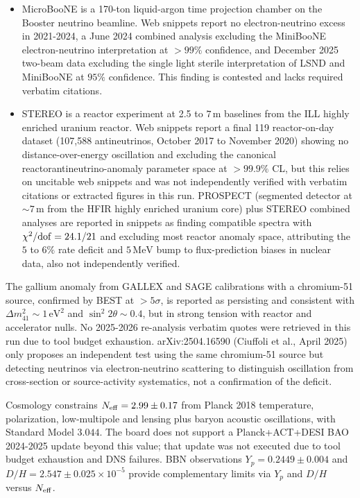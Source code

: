 \documentclass[11pt,a4paper]{article}
\begin{document}
\begin{itemize}
  \item MicroBooNE is a 170-ton liquid-argon time projection chamber on the Booster neutrino beamline. Web snippets report no electron-neutrino excess in 2021-2024, a June 2024 combined analysis excluding the MiniBooNE electron-neutrino interpretation at $>99\%$ confidence, and December 2025 two-beam data excluding the single light sterile interpretation of LSND and MiniBooNE at $95\%$ confidence. This finding is contested and lacks required verbatim citations.
  \item STEREO is a reactor experiment at 2.5 to $7\,\mathrm{m}$ baselines from the ILL highly enriched uranium reactor. Web snippets report a final 119 reactor-on-day dataset (107,588 antineutrinos, October 2017 to November 2020) showing no distance-over-energy oscillation and excluding the canonical reactorantineutrino-anomaly parameter space at $>99.9\%$ CL, but this relies on uncitable web snippets and was not independently verified with verbatim citations or extracted figures in this run. PROSPECT (segmented detector at $\sim 7\,\mathrm{m}$ from the HFIR highly enriched uranium core) plus STEREO combined analyses are reported in snippets as finding compatible spectra with $\chi^2/{\rm dof} = 24.1/21$ and excluding most reactor anomaly space, attributing the $5$ to $6\%$ rate deficit and $5\,\mathrm{MeV}$ bump to flux-prediction biases in nuclear data, also not independently verified.
\end{itemize}
The gallium anomaly from GALLEX and SAGE calibrations with a chromium-51 source, confirmed by BEST at $>5\sigma$, is reported as persisting and consistent with $\Delta m^2_{41} \sim 1\,\mathrm{eV}^2$ and $\sin^2 2\theta \sim 0.4$, but in strong tension with reactor and accelerator nulls. No 2025-2026 re-analysis verbatim quotes were retrieved in this run due to tool budget exhaustion. arXiv:2504.16590 (Ciuffoli et al., April 2025) only proposes an independent test using the same chromium-51 source but detecting neutrinos via electron-neutrino scattering to distinguish oscillation from cross-section or source-activity systematics, not a confirmation of the deficit.

Cosmology constrains $N_{\rm eff} = 2.99 \pm 0.17$ from Planck 2018 temperature, polarization, low-multipole and lensing plus baryon acoustic oscillations, with Standard Model $3.044$. The board does not support a Planck+ACT+DESI BAO 2024-2025 update beyond this value; that update was not executed due to tool budget exhaustion and DNS failures. BBN observations $Y_p = 0.2449 \pm 0.004$ and $D/H = 2.547 \pm 0.025 \times 10^{-5}$ provide complementary limits via $Y_p$ and $D/H$ versus $N_{\rm eff}$.
\end{document}
